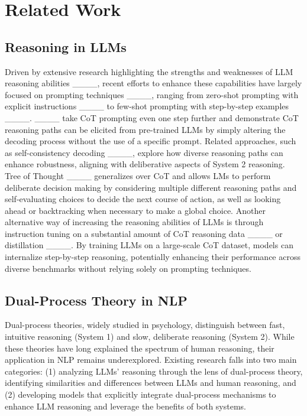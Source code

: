 \section{Related Work}
\subsection{Reasoning in LLMs}
Driven by extensive research highlighting the strengths and weaknesses of LLM reasoning abilities ____, recent efforts to enhance these capabilities have largely focused on prompting techniques ____, ranging from zero-shot prompting with explicit instructions ____ to few-shot prompting with step-by-step examples ____. ____ take CoT prompting even one step further and demonstrate CoT reasoning paths can be elicited from pre-trained LLMs by simply altering the decoding process without the use of a specific prompt. Related approaches, such as self-consistency decoding ____, explore how diverse reasoning paths can enhance robustness, aligning with deliberative aspects of System 2 reasoning.
Tree of Thought ____ generalizes over CoT and allows LMs to perform deliberate decision making by considering multiple different reasoning paths and self-evaluating choices to decide the next course of action, as well as looking ahead or backtracking when necessary to make a global choice.
Another alternative way of increasing the reasoning abilities of LLMs is through instruction tuning on a substantial amount of CoT reasoning data ____ or distillation ____. By training LLMs on a large-scale CoT dataset, models can internalize step-by-step reasoning, potentially enhancing their performance across diverse benchmarks without relying solely on prompting techniques. 

\subsection{Dual-Process Theory in NLP}

Dual-process theories, widely studied in psychology, distinguish between fast, intuitive reasoning (System 1) and slow, deliberate reasoning (System 2). While these theories have long explained the spectrum of human reasoning, their application in NLP remains underexplored. Existing research falls into two main categories: (1) analyzing LLMs’ reasoning through the lens of dual-process theory, identifying similarities and differences between LLMs and human reasoning, and (2) developing models that explicitly integrate dual-process mechanisms to enhance LLM reasoning and leverage the benefits of both systems.

